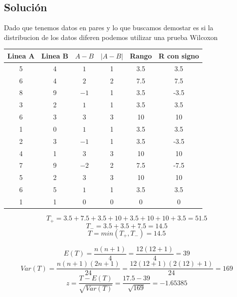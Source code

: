 \documentclass{article}
\begin{document}
\subsection*{Solución}
Dado que tenemos datos en pares y lo que buscamos demostar es si la distribucion de los datos diferen podemos utilizar una prueba Wilcoxon

\begin{center}
    \begin{tabular}{c c c c c c}
        Linea A & Linea B & $ A - B $ & $| A - B |$ & Rango & R con signo \\
        \hline
        5       & 4       & $1$       & 1           & 3.5   & 3.5         \\
        6       & 4       & $2$       & 2           & 7.5   & 7.5         \\
        8       & 9       & $-1$      & 1           & 3.5   & -3.5        \\
        3       & 2       & $1$       & 1           & 3.5   & 3.5         \\
        6       & 3       & $3$       & 3           & 10    & 10          \\
        1       & 0       & $1$       & 1           & 3.5   & 3.5         \\
        2       & 3       & $-1$      & 1           & 3.5   & -3.5        \\
        4       & 1       & $3$       & 3           & 10    & 10          \\
        7       & 9       & $-2$      & 2           & 7.5   & -7.5        \\
        5       & 2       & $3$       & 3           & 10    & 10          \\
        6       & 5       & $1$       & 1           & 3.5   & 3.5         \\
        1       & 1       & $0$       & 0           & 0     & 0           \\
    \end{tabular}
\end{center}

\[T_{+} = 3.5 + 7.5 + 3.5 + 10 + 3.5 + 10 + 10 + 3.5 = 51.5\]
\[T_{-} = 3.5 + 3.5 + 7.5 = 14.5\]
\[T = min(T_{+}, T_{-}) = 14.5\]

\[
    E(T) = \frac{n(n + 1)}{4} = \frac{12(12 + 1)}{4} = 39
\]
\[
    Var(T) = \frac{n(n + 1)(2n + 1)}{24} = \frac{12(12 + 1)(2(12) + 1)}{24} =169
\]
\[
    z = \frac{T - E(T)}{\sqrt{Var(T)}} = \frac{17.5 - 39}{\sqrt{169}} = -1.65385
\]
\end{document}
